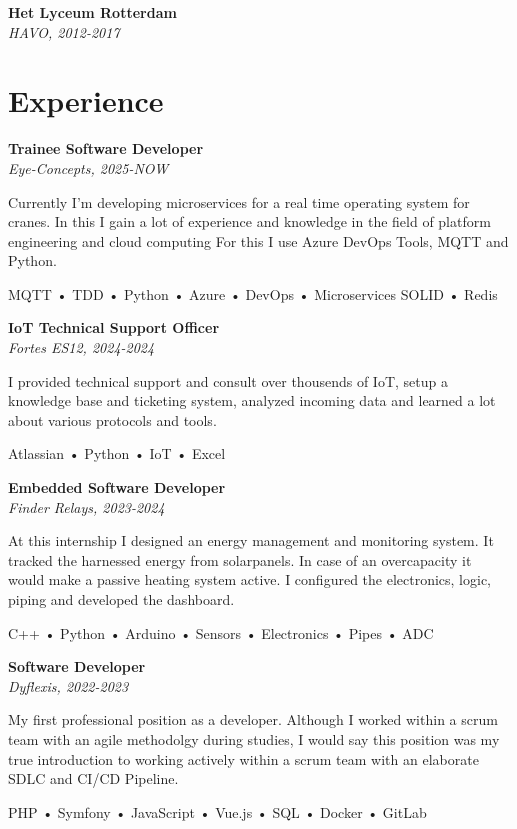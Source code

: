 \documentclass[11pt, twoside, a4paper, titlepage]{article}
\begin{document}
\begin{tcolorbox}[boxsep=0mm, left=0mm, right=0mm, top=0mm, bottom=0mm, height=23cm]
\begin{minipage}[t]{14cm}
\begin{tcolorbox}[grow to left by=0.0cm, colframe=white, colback=white, height=22.9cm]
			\vspace*{0.3cm}
			
			\textbf{Het Lyceum Rotterdam}\\
			\emph{HAVO, 2012-2017}
			
			\section*{Experience}
			\textbf{Trainee Software Developer}\\
			\emph{Eye-Concepts, 2025-NOW}\\
			\parbox{13cm}{Currently I'm developing microservices for a real time operating system for cranes. In this I gain a lot of experience and knowledge in the field of platform engineering and cloud computing For this I use Azure DevOps Tools, MQTT and Python.}
			\parbox{13cm}{ MQTT • TDD • Python • Azure • DevOps • Microservices SOLID • Redis }
			
			\vspace*{0.3cm}
			
			\textbf{IoT Technical Support Officer}\\
			\emph{Fortes ES12, 2024-2024}\\
			\parbox{13cm}{I provided technical support and consult over thousends of IoT, setup a knowledge base and ticketing system, analyzed incoming data and learned a lot about various protocols and tools.}
			\parbox{13cm}{ Atlassian • Python • IoT • Excel }
			
			\vspace*{0.3cm}
			
			\textbf{Embedded Software Developer}\\
			\emph{Finder Relays, 2023-2024}\\
			\parbox{13cm}{At this internship I designed an energy management and monitoring system. It tracked the harnessed energy from solarpanels. In case of an overcapacity it would make a passive heating system active. I configured the electronics, logic, piping and developed the dashboard.}
			\parbox{13cm}{ C++ • Python • Arduino • Sensors • Electronics • Pipes • ADC }
			
			\vspace*{0.3cm}
			
			\textbf{Software Developer}\\
			\emph{Dyflexis, 2022-2023}\\
			\parbox{13cm}{My first professional position as a developer. Although I worked within a scrum team with an agile methodolgy during studies, I would say this position was my true introduction to working actively within a scrum team with an elaborate SDLC and CI/CD Pipeline.}
			\parbox{13cm}{ PHP • Symfony • JavaScript • Vue.js • SQL • Docker • GitLab }
			

\end{tcolorbox}
\end{minipage}
\end{tcolorbox}
\end{document}
